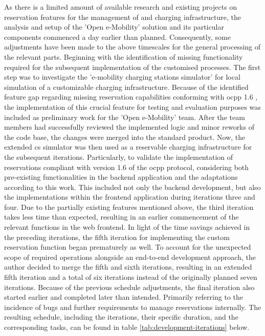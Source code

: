 As there is a limited amount of available research and existing projects on reservation features for the management of  and charging infrastructure, the analysis and setup of the 'Open e-Mobility' \cite{noauthor_open_2023} solution and its particular components commenced a day earlier than planned.
Consequently, some adjustments have been made to the above timescales for the general processing of the relevant parts.
Beginning with the identification of missing functionality required for the subsequent implementation of the customised processes.
The first step was to investigate the 'e-mobility charging stations simulator' \cite{noauthor_julianhbuechere-mobility-charging-stations-simulator_nodate} for local simulation of a customizable charging infrastructure.
Because of the identified feature gap regarding missing reservation capabilities conforming with \acrshort{ocpp} 1.6 \cite{noauthor_ocpp_nodate}, the implementation of this crucial feature for testing and evaluation purposes was included as preliminary work for the 'Open e-Mobility' team.
After the team members had successfully reviewed the implemented logic and minor reworks of the code base, the changes were merged into the standard product.
Now, the extended \acrshort{cs} simulator was then used as a reservable charging infrastructure for the subsequent iterations.
Particularly, to validate the implementation of reservations compliant with version 1.6 of the \acrshort{ocpp} protocol, considering both pre-existing functionalities in the backend application and the adaptations according to this work.
This included not only the backend development, but also the implementations within the frontend application during iterations three and four.
Due to the partially existing features mentioned above, the third iteration takes less time than expected, resulting in an earlier commencement of the relevant functions in the web frontend.
In light of the time savings achieved in the preceding iterations, the fifth iteration for implementing the custom reservation function began prematurely as well. 
To account for the unexpected scope of required operations alongside an end-to-end development approach, the author decided to merge the fifth and sixth iterations, resulting in an extended fifth iteration and a total of six iterations instead of the originally planned seven iterations.
Because of the previous schedule adjustments, the final iteration also started earlier and completed later than intended. 
Primarily referring to the incidence of bugs and further requirements to manage reservations internally.
The resulting schedule, including the iterations, their specific duration, and the corresponding tasks, can be found in table \ref{tab:development-iterations} below.

